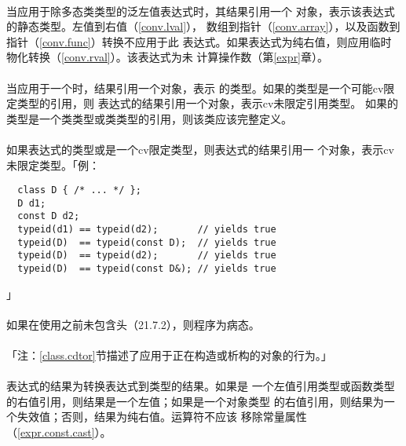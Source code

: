 \paragraph{}
当应用于除多态类类型的泛左值表达式时，其结果引用一个
对象，表示该表达式的静态类型。左值到右值（\ref{conv.lval}），
数组到指针（\ref{conv.array}），以及函数到指针（\ref{conv.func}）转换不应用于此
表达式。如果表达式为纯右值，则应用临时物化转换（\ref{conv.rval}）。该表达式为未
计算操作数（第\ref{expr}章）。

\paragraph{}
当应用于一个时，结果引用一个对象，表示
的类型。如果的类型是一个可能cv限定类型的引用，则
表达式的结果引用一个对象，表示cv未限定引用类型。
如果的类型是一个类类型或类类型的引用，则该类应该完整定义。

\paragraph{}
如果表达式的类型或是一个cv限定类型，则表达式的结果引用一
个对象，表示cv未限定类型。「例：
\begin{lstlisting}
  class D { /* ... */ };
  D d1;
  const D d2;
  typeid(d1) == typeid(d2);       // yields true
  typeid(D)  == typeid(const D);  // yields true
  typeid(D)  == typeid(d2);       // yields true
  typeid(D)  == typeid(const D&); // yields true
\end{lstlisting}」

\paragraph{}
如果在使用之前未包含头（21.7.2），则程序为病态。

\paragraph{}
「注：\ref{class.cdtor}节描述了应用于正在构造或析构的对象的行为。」

\paragraph{}
表达式的结果为转换表达式到类型的结果。如果是
一个左值引用类型或函数类型的右值引用，则结果是一个左值；如果是一个对象类型
的右值引用，则结果为一个失效值；否则，结果为纯右值。运算符不应该
移除常量属性（\ref{expr.const.cast}）。

